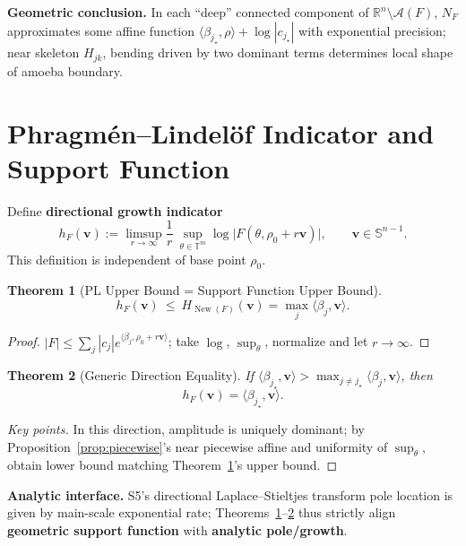 \documentclass[11pt,a4paper]{article}
\newtheorem{theorem}{Theorem}[section]
\theoremstyle{remark}
\DeclareMathOperator{\New}{New}
\begin{document}
\textbf{Geometric conclusion.} In each ``deep'' connected component of $\mathbb{R}^n\setminus\mathcal{A}(F)$, $N_F$ approximates some affine function $\langle\beta_{j_\star},\rho\rangle+\log|c_{j_\star}|$ with exponential precision; near skeleton $H_{jk}$, bending driven by two dominant terms determines local shape of amoeba boundary.

\section{Phragm\'en--Lindel\"of Indicator and Support Function}

Define \textbf{directional growth indicator}
\begin{equation}
h_F(\mathbf{v}):=\limsup_{r\to\infty}\frac{1}{r}\ \sup_{\theta\in\mathbb{T}^m}\log\bigl|F(\theta,\rho_0+r\mathbf{v})\bigr|,
\qquad \mathbf{v}\in\mathbb{S}^{n-1}.
\end{equation}
This definition is independent of base point $\rho_0$.

\begin{theorem}[PL Upper Bound = Support Function Upper Bound]\label{thm:pl_upper}
\begin{equation}
h_F(\mathbf{v})\ \le\ H_{\New(F)}(\mathbf{v})=\max_{j}\langle\beta_j,\mathbf{v}\rangle.
\end{equation}
\end{theorem}

\begin{proof}
$|F|\le\sum_j|c_j|e^{\langle\beta_j,\rho_0+r\mathbf{v}\rangle}$; take $\log$, $\sup_\theta$, normalize and let $r\to\infty$.
\end{proof}

\begin{theorem}[Generic Direction Equality]\label{thm:pl_equality}
If $\langle\beta_{j_\star},\mathbf{v}\rangle>\max_{j\ne j_\star}\langle\beta_j,\mathbf{v}\rangle$, then
\begin{equation}
h_F(\mathbf{v})=\langle\beta_{j_\star},\mathbf{v}\rangle.
\end{equation}
\end{theorem}

\begin{proof}[Key points]
In this direction, amplitude is uniquely dominant; by Proposition~\ref{prop:piecewise}'s near piecewise affine and uniformity of $\sup_\theta$, obtain lower bound matching Theorem~\ref{thm:pl_upper}'s upper bound.
\end{proof}

\textbf{Analytic interface.} S5's directional Laplace--Stieltjes transform pole location is given by main-scale exponential rate; Theorems~\ref{thm:pl_upper}--\ref{thm:pl_equality} thus strictly align \textbf{geometric support function} with \textbf{analytic pole/growth}.
\end{document}
